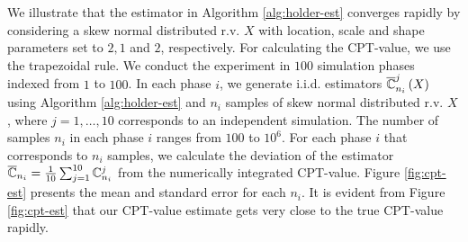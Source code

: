 We illustrate that the estimator in Algorithm \ref{alg:holder-est} converges rapidly by considering a skew normal distributed  r.v. $X$ with location, scale and shape parameters set to $2,1$ and $2$, respectively. For calculating the CPT-value, we use the trapezoidal rule. 
We conduct the experiment in $100$ simulation phases indexed from $1$ to $100$. In each phase $i$, we generate i.i.d. estimators $\overline{\mathbb{C}}^j_{n_i}\left(X\right)$ using Algorithm \ref{alg:holder-est} and $n_i$ samples of skew normal distributed r.v. $X$, where $j=1,\ldots,10$ corresponds to an independent simulation. The number of samples $n_i$ in each phase $i$ ranges from $100$ to $10^6$. For each phase $i$ that corresponds to $n_i$ samples, we calculate the deviation of the estimator $\overline {\mathbb{C}}_{n_i} = \frac1{10}\sum_{j=1}^{10}\mathbb{C}^j_{n_i}$ from the numerically integrated CPT-value. Figure \ref{fig:cpt-est} presents the mean and standard error for each $n_i$. 
It is evident from Figure \ref{fig:cpt-est} that our CPT-value estimate gets very close to the true CPT-value rapidly.

\newcommand{\errorband}[5][]{ %
\pgfplotstableread[col sep=tab, skip first n=2]{#2}\datatable

    \addplot [draw=none, fill=gray!40, stack plots=y, area legend, #1] table [
        x={#3},
        y expr=4*\thisrow{#5}
    ] {\datatable} \closedcycle;

    \addplot [forget plot, stack plots=y,draw=none] table [x={#3}, y expr=-(\thisrow{#4}+2*\thisrow{#5})] {\datatable};
}

